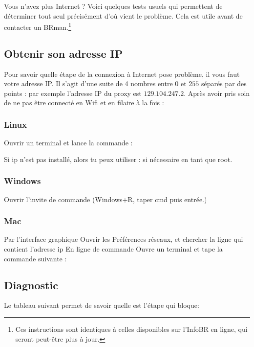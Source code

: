 \label{diagnostic}
Vous n'avez plus Internet ? Voici quelques tests usuels qui permettent de déterminer tout seul précisément d'où vient le problème. Cela est utile avant de contacter un BRman.\footnote{Ces instructions sont identiques à celles disponibles sur l'InfoBR en ligne, qui seront peut-être plus à jour.}

\subsection{Obtenir son adresse IP}
Pour savoir quelle étape de la connexion à Internet pose problème, il vous faut votre adresse IP. Il s'agit d'une suite de 4 nombres entre $0$ et $255$ séparés par des points : par exemple l'adresse IP du proxy est $129.104.247.2$. Après avoir pris soin de ne pas être connecté en Wifi et en filaire à la fois :

\subsubsection{Linux}
Ouvrir un terminal et lance la commande :

Si ip n'est pas installé, alors tu peux utiliser :
si nécessaire en tant que root.
 
\subsubsection{Windows}
Ouvrir l'invite de commande (Windows+R, taper cmd puis entrée.)
 
\subsubsection{Mac}
Par l'interface graphique
Ouvrir les Préférences réseaux, et chercher la ligne qui contient l'adresse ip
En ligne de commande
Ouvre un terminal et tape la commande suivante :

\subsection{Diagnostic}
Le tableau suivant permet de savoir quelle est l'étape qui bloque:

